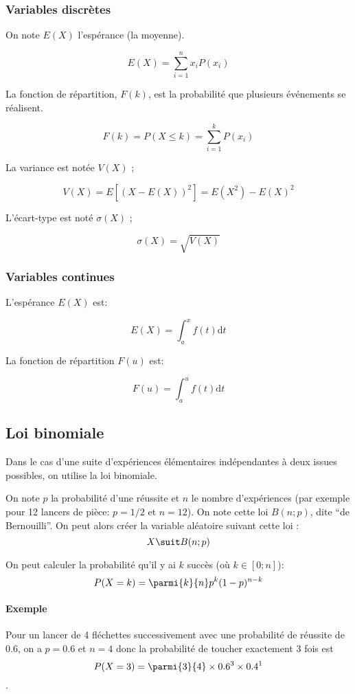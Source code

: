 \documentclass[10pt,a4paper,french]{article}
\begin{document}
\subsubsection{Variables discrètes}

On note $E(X)$ l'espérance (la moyenne).

\[
E(X) = \sum_{i=1}^n x_i P(x_i)
\]

La fonction de répartition, $F(k)$, est la probabilité que plusieurs événements se réalisent.

\[
F(k) = P(X \leq k) = \sum_{i=1}^k P(x_i)
\]

La variance est notée $V(X)$ ;

\[
V(X) = E[(X-E(X))^2] = E(X^2) - E(X)^2
\]

L'écart-type est noté $\sigma(X)$ ;

\[
\sigma(X) = \sqrt{V(X)}
\]

\subsubsection{Variables continues}

L'espérance $E(X)$ est:

\[
E(X)= \int_a^x f(t) \text{d} t
\]

La fonction de répartition $F(u)$ est:

\[
F(u) = \int_a^u f(t) \text{d} t
\]

\subsection{Loi binomiale}

Dans le cas d'une suite d'expériences élémentaires indépendantes à deux issues possibles, on utilise la loi binomiale.

On note $p$ la probabilité d'une réussite et $n$ le nombre d'expériences (par exemple pour 12 lancers de pièce: $p=1/2$ et $n=12$). On note cette loi $B(n; p)$, dite ``de Bernouilli''. On peut alors créer la variable aléatoire suivant cette loi : \[ X \suit B(n; p) \]

On peut calculer la probabilité qu'il y ai $k$ succès (où $k \in [0; n]$):
\[
P(X=k) = \parmi{k}{n} p^k (1-p)^{n-k}
\]

\paragraph{Exemple}
Pour un lancer de 4 fléchettes successivement avec une probabilité de réussite de $0.6$, on a $p=0.6$ et $n=4$ donc la probabilité de toucher exactement 3 fois est \[ P(X=3) = \parmi{3}{4} \times 0.6^3 \times 0.4^1 \].
\end{document}
